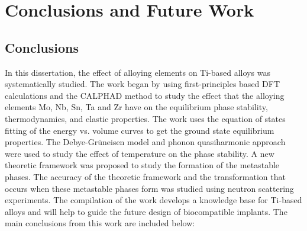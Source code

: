 \chapter{Conclusions and Future Work}

\section{Conclusions}

In this dissertation, the effect of alloying elements on Ti-based alloys was systematically studied. The work began by using first-principles based DFT calculations and the CALPHAD method to study the effect that the alloying elements Mo, Nb, Sn, Ta and Zr have on the equilibrium phase stability, thermodynamics, and elastic properties. The work uses the equation of states fitting of the energy vs. volume curves to get the ground state equilibrium properties. The Debye-Gr\"uneisen model and phonon quasiharmonic approach were used to study the effect of temperature on the phase stability. A new theoretic framework was proposed to study the formation of the metastable phases. The accuracy of the theoretic framework and the transformation that occurs when these metastable phases form was studied using neutron scattering experiments. The compilation of the work develops a knowledge base for Ti-based alloys and will help to guide the future design of biocompatible implants. The main conclusions from this work are included below:

